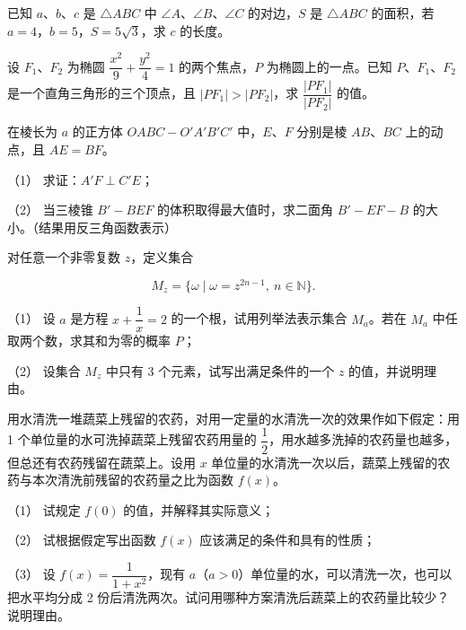 \begin{question}
已知 $a\text{、}b\text{、}c$ 是 $\triangle ABC$ 中 $\angle A\text{、}\angle B\text{、}\angle C$ 的对边，$S$ 是 $\triangle ABC$ 的面积，若 $a=4$，$b=5$，$S=5\sqrt3$，求 $c$ 的长度。

\end{question}
\begin{question}
设 $F_1\text{、}F_2$ 为椭圆 $\dfrac{x^2}{9}+\dfrac{y^2}{4}=1$ 的两个焦点，$P$ 为椭圆上的一点。已知 $P\text{、}F_1\text{、}F_2$ 是一个直角三角形的三个顶点，且 $|PF_1|>|PF_2|$，求 $\dfrac{|PF_1|}{|PF_2|}$ 的值。

\Needspace{0.4\textheight}
\end{question}
\begin{question}
在棱长为 $a$ 的正方体 $OABC-O'A'B'C'$ 中，$E\text{、}F$ 分别是棱 $AB\text{、}BC$ 上的动点，且 $AE=BF$。
\nopagebreak[4]
\begin{center}\end{center}
\nopagebreak[4]
（1） 求证：$A'F\perp C'E$；

（2） 当三棱锥 $B'-BEF$ 的体积取得最大值时，求二面角 $B'-EF-B$ 的大小。（结果用反三角函数表示）

\end{question}
\begin{question}
对任意一个非零复数 $z$，定义集合

\nopagebreak[4]
\[
M_z=\{\omega\mid \omega=z^{2n-1},\ n\in\mathbb N\}.
\]

（1） 设 $a$ 是方程 $x+\dfrac1x=2$ 的一个根，试用列举法表示集合 $M_a$。若在 $M_a$ 中任取两个数，求其和为零的概率 $P$；

（2） 设集合 $M_z$ 中只有 3 个元素，试写出满足条件的一个 $z$ 的值，并说明理由。

\end{question}
\begin{question}
用水清洗一堆蔬菜上残留的农药，对用一定量的水清洗一次的效果作如下假定：用 1 个单位量的水可洗掉蔬菜上残留农药用量的 $\dfrac12$，用水越多洗掉的农药量也越多，但总还有农药残留在蔬菜上。设用 $x$ 单位量的水清洗一次以后，蔬菜上残留的农药与本次清洗前残留的农药量之比为函数 $f(x)$。

（1） 试规定 $f(0)$ 的值，并解释其实际意义；

（2） 试根据假定写出函数 $f(x)$ 应该满足的条件和具有的性质；

（3） 设 $f(x)=\dfrac1{1+x^2}$，现有 $a$（$a>0$）单位量的水，可以清洗一次，也可以把水平均分成 2 份后清洗两次。试问用哪种方案清洗后蔬菜上的农药量比较少？说明理由。

\Needspace{0.4\textheight}
\end{question}
